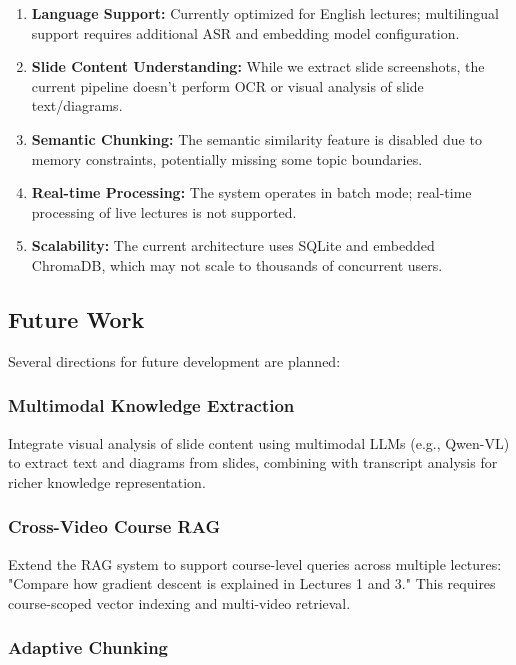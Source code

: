 \documentclass[12pt,a4paper]{article}
\begin{document}
\begin{enumerate}
    \item \textbf{Language Support:} Currently optimized for English lectures; multilingual support requires additional ASR and embedding model configuration.
    \item \textbf{Slide Content Understanding:} While we extract slide screenshots, the current pipeline doesn't perform OCR or visual analysis of slide text/diagrams.
    \item \textbf{Semantic Chunking:} The semantic similarity feature is disabled due to memory constraints, potentially missing some topic boundaries.
    \item \textbf{Real-time Processing:} The system operates in batch mode; real-time processing of live lectures is not supported.
    \item \textbf{Scalability:} The current architecture uses SQLite and embedded ChromaDB, which may not scale to thousands of concurrent users.
\end{enumerate}

\subsection{Future Work}

Several directions for future development are planned:

\subsubsection{Multimodal Knowledge Extraction}

Integrate visual analysis of slide content using multimodal LLMs (e.g., Qwen-VL) to extract text and diagrams from slides, combining with transcript analysis for richer knowledge representation.

\subsubsection{Cross-Video Course RAG}

Extend the RAG system to support course-level queries across multiple lectures: "Compare how gradient descent is explained in Lectures 1 and 3." This requires course-scoped vector indexing and multi-video retrieval.

\subsubsection{Adaptive Chunking}
\end{document}
